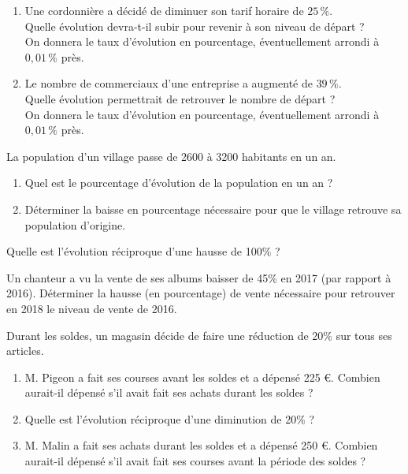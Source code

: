 {\begin{Exercice}
\begin{enumerate}[itemsep=0.4em]
	\item \begin{minipage}[t]{\linewidth}Une cordonnière a décidé de diminuer son tarif horaire de $25\,\%$.\\Quelle évolution devra-t-il subir pour revenir à son niveau de départ ?\\On donnera le taux d'évolution en pourcentage, éventuellement arrondi à $0,01\,\%$ près.\end{minipage}
	\item \begin{minipage}[t]{\linewidth}Le nombre de commerciaux d'une entreprise a augmenté de $39\,\%$.\\Quelle évolution permettrait de retrouver le nombre de départ ?\\On donnera le taux d'évolution en pourcentage, éventuellement arrondi à $0,01\,\%$ près.\end{minipage}
\end{enumerate}
\end{Exercice}




\begin{Exercice} %
La population d'un village passe de 2600 à 3200 habitants en un an.
\begin{enumerate}
\item Quel est le pourcentage d'évolution de la population en un an ?
\item Déterminer la baisse en pourcentage nécessaire pour que le village retrouve sa population d'origine.
\end{enumerate}
\end{Exercice}










\begin{Exercice} %
Quelle est l'évolution réciproque d'une hausse de 100\% ?
\end{Exercice}


\begin{Exercice} %
Un chanteur a vu la vente de ses albums baisser de 45\% en 2017 (par rapport à 2016). Déterminer la hausse (en pourcentage) de vente nécessaire pour retrouver en 2018 le niveau de vente de
2016.
\end{Exercice}

\begin{Exercice} %
Durant les soldes, un magasin décide de faire une réduction de 20\% sur tous ses articles.
\begin{enumerate}
\item M. Pigeon a fait ses courses avant les soldes et a dépensé 225 €. Combien aurait-il dépensé s'il avait fait ses achats durant les soldes ?
\item Quelle est l'évolution réciproque d'une diminution de 20\% ?
\item M. Malin a fait ses achats durant les soldes et a dépensé 250 €. Combien aurait-il dépensé s'il avait fait ses courses avant la période des soldes ?
\end{enumerate}
\end{Exercice}

}
